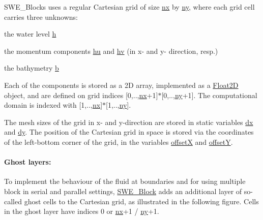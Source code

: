 S\-W\-E\-\_\-\-Blocks uses a regular Cartesian grid of size \hyperlink{classSWE__Block_a46ec0dc1157997bd255fb39924f1e2bb}{nx} by \hyperlink{classSWE__Block_a3f139630d12423eb4bd7df3e45c7f5da}{ny}, where each grid cell carries three unknowns\-:
\begin{DoxyItemize}
\item the water level \hyperlink{classSWE__Block_a64a0f8f437f38b5f3b8ec5b4abdb864e}{h}
\item the momentum components \hyperlink{classSWE__Block_aec2c1278fdb23f083216d8d397f26060}{hu} and \hyperlink{classSWE__Block_a0897aa3c2d78749f209c95e08196d831}{hv} (in x-\/ and y-\/ direction, resp.)
\item the bathymetry \hyperlink{classSWE__Block_af7487209129f40b26ea171762754a261}{b}
\end{DoxyItemize}

Each of the components is stored as a 2\-D array, implemented as a \hyperlink{classFloat2D}{Float2\-D} object, and are defined on grid indices \mbox{[}0,..,\hyperlink{classSWE__Block_a46ec0dc1157997bd255fb39924f1e2bb}{nx}+1\mbox{]}$\ast$\mbox{[}0,..,\hyperlink{classSWE__Block_a3f139630d12423eb4bd7df3e45c7f5da}{ny}+1\mbox{]}. The computational domain is indexed with \mbox{[}1,..,\hyperlink{classSWE__Block_a46ec0dc1157997bd255fb39924f1e2bb}{nx}\mbox{]}$\ast$\mbox{[}1,..,\hyperlink{classSWE__Block_a3f139630d12423eb4bd7df3e45c7f5da}{ny}\mbox{]}.

The mesh sizes of the grid in x-\/ and y-\/direction are stored in static variables \hyperlink{classSWE__Block_af2262b1cce6834d939c5a2315dae49b1}{dx} and \hyperlink{classSWE__Block_a9feb988748d792bca0ca0508e43bd87f}{dy}. The position of the Cartesian grid in space is stored via the coordinates of the left-\/bottom corner of the grid, in the variables \hyperlink{classSWE__Block_aa9e9b1fa797c133c4989e4c54f09b542}{offset\-X} and \hyperlink{classSWE__Block_aa05241101a66f0f0548eba6dbbaa1bbb}{offset\-Y}.

\paragraph*{Ghost layers\-:}

To implement the behaviour of the fluid at boundaries and for using multiple block in serial and parallel settings, \hyperlink{classSWE__Block}{S\-W\-E\-\_\-\-Block} adds an additional layer of so-\/called ghost cells to the Cartesian grid, as illustrated in the following figure. Cells in the ghost layer have indices 0 or \hyperlink{classSWE__Block_a46ec0dc1157997bd255fb39924f1e2bb}{nx}+1 / \hyperlink{classSWE__Block_a3f139630d12423eb4bd7df3e45c7f5da}{ny}+1.



